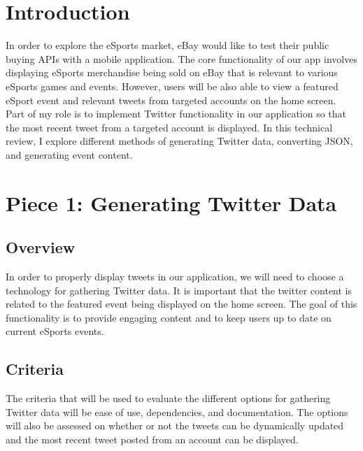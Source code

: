 \documentclass[onecolumn, draftclsnofoot,10pt, compsoc]{IEEEtran}
\begin{document}
\begin{titlepage}
\begin{singlespace}
\begin{abstract}
        \end{abstract}     
    \end{singlespace}
\end{titlepage}
\newpage
{}
\tableofcontents
\clearpage

\section{Introduction}
In order to explore the eSports market, eBay would like to test their public buying APIs with a mobile application. 
The core functionality of our app involves displaying eSports merchandise being sold on eBay that is relevant to various eSports games and events. 
However, users will be also able to view a featured eSport event and relevant tweets from targeted accounts on the home screen. 
Part of my role is to implement Twitter functionality in our application so that the most recent tweet from a targeted account is displayed.
In this technical review, I explore different methods of generating Twitter data, converting JSON, and generating event content. 

\section{Piece 1: Generating Twitter Data}
\subsection{Overview}
In order to properly display tweets in our application, we will need to choose a technology for gathering Twitter data.
It is important that the twitter content is related to the featured event being displayed on the home screen.
The goal of this functionality is to provide engaging content and to keep users up to date on current eSports events. 
\subsection{Criteria}
The criteria that will be used to evaluate the different options for gathering Twitter data will be ease of use, dependencies, and documentation.
The options will also be assessed on whether or not the tweets can be dynamically updated and the most recent tweet posted from an account can be displayed. 
\end{document}

